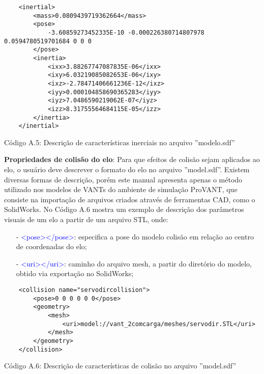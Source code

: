 	\begin{verbatim}
	<inertial>
		<mass>0.0809439719362664</mass>
		<pose>
			-3.60859273452335E-10 -0.000226380714807978 0.0594780519701684 0 0 0
		</pose>
		<inertia>
			<ixx>3.88267747087835E-06</ixx>
			<ixy>6.03219085082653E-06</ixy>
			<ixz>-2.78471406661236E-12</ixz>
			<iyy>0.000104858690365283</iyy>
			<iyz>7.0486590219062E-07</iyz>
			<izz>8.31755564684115E-05</izz>		
		</inertia>
	</inertial>
	\end{verbatim}
	\centerline{Código A.5: Descrição de características inerciais no arquivo ''modelo.sdf''}
	
	\vspace{1cm}

\noindent \textbf{Propriedades de colisão do elo}: Para que efeitos de colisão sejam aplicados ao elo, o usuário deve descrever o formato do elo no arquivo ''model.sdf''. Existem diversas formas de descrição, porém este manual apresenta apenas o método utilizado nos modelos de VANTs do ambiente de simulação ProVANT, que consiste na importação de arquivos criados através de ferramentas CAD, como o SolidWorks. No Código A.6 mostra um exemplo de descrição dos parâmetros visuais de um elo a partir de um arquivo STL, onde:
\small
\begin{itemize}
\setlength{\itemsep}{1pt}
\setlength{\parskip}{0pt}
\setlength{\parsep}{0pt}
\item[-] \textcolor{blue}{<pose></pose>}: especifica a pose do modelo colisão em relação ao centro de coordenadas do elo;
\item[-] \textcolor{blue}{<uri></uri>}: caminho do arquivo mesh, a partir do diretório do modelo, obtido via exportação no SolidWorks; 
\end{itemize} \normalsize


	\begin{verbatim}
	<collision name="servodircollision">
		<pose>0 0 0 0 0 0</pose>
		<geometry>
			<mesh>
				<uri>model://vant_2comcarga/meshes/servodir.STL</uri>
			</mesh>
		</geometry>
	</collision>
	\end{verbatim}
	\centerline{Código A.6: Descrição de características de colisão no arquivo ''model.sdf''}

	\vspace{1cm}

